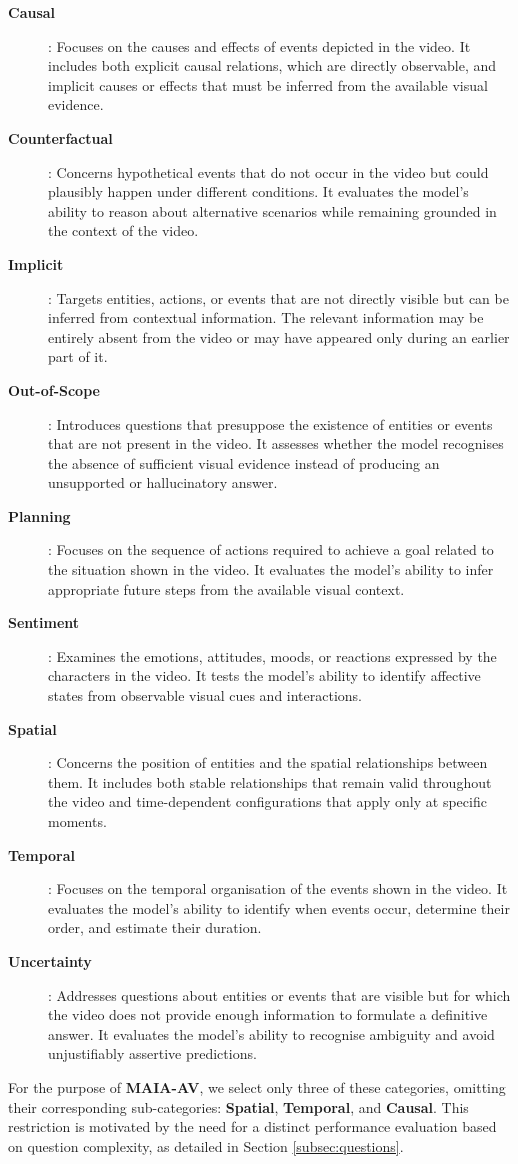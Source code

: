 \begin{description}
\item[\textbf{Causal}]: Focuses on the causes and effects of events depicted in the video. It includes both explicit causal relations, which are directly observable, and implicit causes or effects that must be inferred from the available visual evidence.
\item[\textbf{Counterfactual}]: Concerns hypothetical events that do not occur in the video but could plausibly happen under different conditions. It evaluates the model's ability to reason about alternative scenarios while remaining grounded in the context of the video.
\item[\textbf{Implicit}]: Targets entities, actions, or events that are not directly visible but can be inferred from contextual information. The relevant information may be entirely absent from the video or may have appeared only during an earlier part of it.
\item[\textbf{Out-of-Scope}]: Introduces questions that presuppose the existence of entities or events that are not present in the video. It assesses whether the model recognises the absence of sufficient visual evidence instead of producing an unsupported or hallucinatory answer.
\item[\textbf{Planning}]: Focuses on the sequence of actions required to achieve a goal related to the situation shown in the video. It evaluates the model's ability to infer appropriate future steps from the available visual context.
\item[\textbf{Sentiment}]: Examines the emotions, attitudes, moods, or reactions expressed by the characters in the video. It tests the model's ability to identify affective states from observable visual cues and interactions.
\item[\textbf{Spatial}]: Concerns the position of entities and the spatial relationships between them. It includes both stable relationships that remain valid throughout the video and time-dependent configurations that apply only at specific moments.
\item[\textbf{Temporal}]: Focuses on the temporal organisation of the events shown in the video. It evaluates the model's ability to identify when events occur, determine their order, and estimate their duration.
\item[\textbf{Uncertainty}]: Addresses questions about entities or events that are visible but for which the video does not provide enough information to formulate a definitive answer. It evaluates the model's ability to recognise ambiguity and avoid unjustifiably assertive predictions.
\end{description}
For the purpose of \textbf{\ac{MAIA-AV}}, we select only three of these categories, omitting their corresponding sub-categories: \textbf{Spatial}, \textbf{Temporal}, and \textbf{Causal}.
This restriction is motivated by the need for a distinct performance evaluation based on question complexity, as detailed in Section \ref{subsec:questions}.

